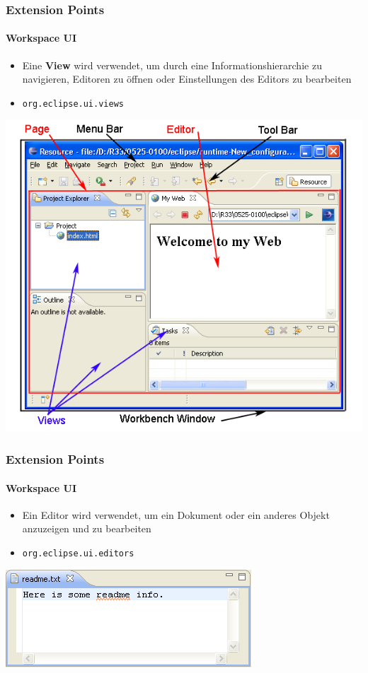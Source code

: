 {\begin{frame}
  \frametitle{Extension Points}
  \framesubtitle{Workspace UI}
  \begin{itemize}
    \item Eine \textbf{View} wird verwendet, um durch eine Informationshierarchie zu navigieren, Editoren zu öffnen oder Einstellungen des Editors zu bearbeiten
    \item \texttt{org.eclipse.ui.views}
  \end{itemize}
  \includegraphics[scale=0.3]{images/workspace-ui.png}    
\end{frame}

\begin{frame}
  \frametitle{Extension Points}
  \framesubtitle{Workspace UI}
  \begin{itemize}
    \item Ein Editor wird verwendet, um ein Dokument oder ein anderes Objekt anzuzeigen und zu bearbeiten
    \item \texttt{org.eclipse.ui.editors}
  \end{itemize}
  \includegraphics[scale=0.4]{images/editor.png}    
\end{frame}

}
